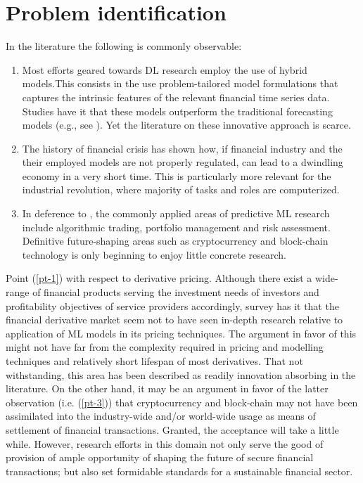 \documentclass[a4paper,11pt]{scrartcl}
\newcommand{\eg}{e.g.}
\begin{document}
\section{Problem identification}
In the literature the following is commonly observable:
\begin{enumerate}
    \item \label{pt-1} Most efforts geared towards DL research employ the use of hybrid models.This consists in the use problem-tailored model formulations that captures the intrinsic features of the relevant financial time series data. Studies have it that these models outperform the traditional forecasting models (\eg, see \citep{ozbayoglu2020deep}). Yet the literature on these innovative approach is scarce.
    \item \label{pt-2} The history of financial crisis has shown how, if financial industry and the their employed models are not properly regulated, can lead to a dwindling economy in a very short time. This is particularly more relevant for the industrial revolution, where majority of tasks and roles are computerized.
    \item \label{pt-3} In deference to \citep{sezer2020financial}, the commonly applied areas of predictive ML research include algorithmic trading, portfolio management and risk assessment. Definitive future-shaping areas such as cryptocurrency and block-chain technology is only beginning to enjoy little concrete research.
\end{enumerate}

Point (\ref{pt-1}) with respect to derivative pricing. Although there exist a wide-range of financial products serving the investment needs of investors and profitability objectives of service providers accordingly, survey has it that the financial derivative market seem not to have seen in-depth research relative to application of ML models in its pricing techniques. The argument in favor of this might not have far from the complexity required in pricing and modelling techniques and relatively short lifespan of most derivatives. That not withstanding, this area has been described as readily innovation absorbing in the literature.
\newline
On the other hand, it may be an argument in favor of the latter observation (i.e. (\ref{pt-3})) that cryptocurrency and block-chain may not have been assimilated into the industry-wide and/or world-wide usage as means of settlement of financial transactions. Granted, the acceptance will take a little while. However, research efforts in this domain not only serve the good of provision of ample opportunity of shaping the future of secure financial transactions; but also set formidable standards for a sustainable financial sector.
%
\end{document}
